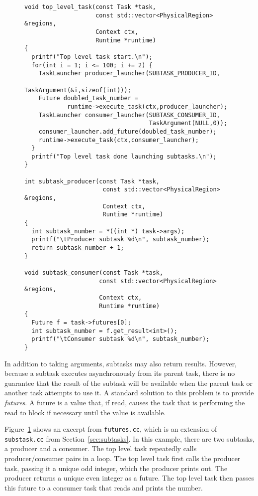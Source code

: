 \begin{figure}
\begin{lstlisting}
void top_level_task(const Task *task,
                    const std::vector<PhysicalRegion> &regions,
                    Context ctx,
                    Runtime *runtime)
{
  printf("Top level task start.\n");
  for(int i = 1; i <= 100; i += 2) {
    TaskLauncher producer_launcher(SUBTASK_PRODUCER_ID, 
                                   TaskArgument(&i,sizeof(int)));
    Future doubled_task_number =  
            runtime->execute_task(ctx,producer_launcher);
    TaskLauncher consumer_launcher(SUBTASK_CONSUMER_ID, 
                                   TaskArgument(NULL,0));
    consumer_launcher.add_future(doubled_task_number);
    runtime->execute_task(ctx,consumer_launcher);
  }
  printf("Top level task done launching subtasks.\n");
}

int subtask_producer(const Task *task,
                      const std::vector<PhysicalRegion> &regions,
                      Context ctx,
                      Runtime *runtime)
{
  int subtask_number = *((int *) task->args);
  printf("\tProducer subtask %d\n", subtask_number);
  return subtask_number + 1;
}

void subtask_consumer(const Task *task,
                     const std::vector<PhysicalRegion> &regions,
                     Context ctx,
                     Runtime *runtime)
{
  Future f = task->futures[0];
  int subtask_number = f.get_result<int>();
  printf("\tConsumer subtask %d\n", subtask_number);
}
\end{lstlisting}
\caption{}
\label{fig:futures}
\end{figure}

In addition to taking arguments, subtasks may also return results.
However, because a subtask executes asynchronously from its parent
task, there is no guarantee that the result of the subtask will be
available when the parent task or another task attempts to use it.  A
standard solution to this problem is to provide {\em futures}.  A future
is a value that, if read, causes the task that is performing the
read to block if necessary until the value is available.

Figure~\ref{fig:futures} shows an excerpt from {\tt futures.cc}, which
is an extension of {\tt substask.cc} from
Section~\ref{sec:subtasks}.  In this example, there are two subtasks,
a producer and a consumer.  The top level task repeatedly calls
\mbox{producer/consumer} pairs in a loop.  The top level task first calls the
producer task, passing it a unique odd integer, which the producer
prints out.  The producer returns a unique even integer as a future.
The top level task then passes this future to a consumer task that
reads and prints the number.

